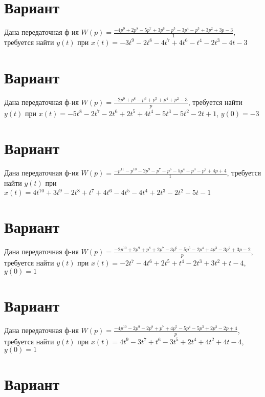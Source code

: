 \documentclass{article}
\begin{document}
\section{Вариант}

Дана передаточная ф-ия $W(p)=\frac{-4p^{9}+2p^{8}-5p^{7}+3p^{6}-p^{5}-3p^{4}-p^{3}+3p^{2}+3p-3}{1}$, требуется найти $y(t)$ при $x(t)=-3t^{9}-2t^{8}-4t^{7}+4t^{6}-t^{4}-2t^{3}-4t-3$



\section{Вариант}

Дана передаточная ф-ия $W(p)=\frac{-2p^{9}+p^{8}-p^{6}+p^{5}+p^{4}+p^{2}-3}{p}$, требуется найти $y(t)$ при $x(t)=-5t^{8}-2t^{7}-2t^{6}+2t^{5}+4t^{4}-5t^{3}-5t^{2}-2t+1$, $y(0)=-3$



\section{Вариант}

Дана передаточная ф-ия $W(p)=\frac{-p^{11}-p^{10}-2p^{9}-p^{7}-p^{6}-5p^{4}-p^{3}-p^{2}+4p+4}{1}$, требуется найти $y(t)$ при $x(t)=4t^{10}+3t^{9}-2t^{8}+t^{7}+4t^{6}-4t^{5}-4t^{4}+2t^{3}-2t^{2}-5t-1$



\section{Вариант}

Дана передаточная ф-ия $W(p)=\frac{-2p^{10}+2p^{9}+p^{8}+2p^{7}-3p^{6}-5p^{5}-2p^{4}+4p^{3}-3p^{2}+3p-2}{p}$, требуется найти $y(t)$ при $x(t)=-2t^{7}-4t^{6}+2t^{5}+t^{4}-2t^{3}+3t^{2}+t-4$, $y(0)=1$



\section{Вариант}

Дана передаточная ф-ия $W(p)=\frac{-4p^{10}-2p^{9}-2p^{8}+p^{7}+4p^{5}-5p^{4}-5p^{3}+2p^{2}-2p+4}{p}$, требуется найти $y(t)$ при $x(t)=4t^{9}-3t^{7}+t^{6}-3t^{5}+2t^{4}+4t^{2}+4t-4$, $y(0)=1$



\section{Вариант}
\end{document}
